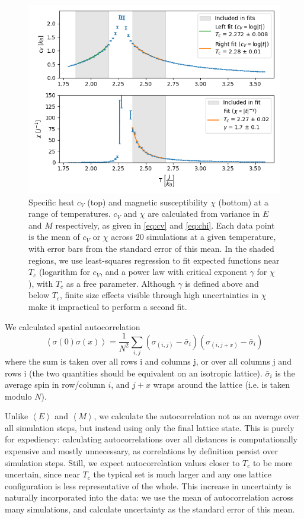 \documentclass[letter,scriptaddress,twocolumn, prl,nofootinbib]{revtex4}
\newcommand{\submin}[1]{\left\langle #1 \right\rangle}
\begin{document}
\begin{figure}[h]
	\begin{center}
		\includegraphics[width=.4\textwidth]{figs/fig3.png}
		\caption{Specific heat $c_V$ (top) and magnetic susceptibility $\chi$ (bottom) at a range of temperatures. $c_V$ and $\chi$ are calculated from variance in $E$ and $M$ respectively, as given in \autoref{eq:cv} and \autoref{eq:chi}. Each data point is the mean of $c_V$ or $\chi$ across 20 simulations at a given temperature, with error bars from the standard error of this mean. In the shaded regions, we use least-squares regression to fit expected functions near $T_c$ (logarithm for $c_V$, and a power law with critical exponent $\gamma$ for $\chi$), with $T_c$ as a free parameter. Although $\gamma$ is defined above and below $T_c$, finite size effects visible through high uncertainties in $\chi$ make it impractical to perform a second fit.}
		\label{fig:fig3}
	\end{center}
\end{figure}

We calculated spatial autocorrelation 
\begin{equation}
	\label{autocor}
	\submin{\sigma(0)\sigma(x)} = \frac{1}{N^2}\sum_{i, j} (\sigma_{(i, j)} - \bar{\sigma}_i)(\sigma_{(i, j + x)} - \bar{\sigma}_i)
\end{equation}
where the sum is taken over all rows i and columns j, or over all columns j and rows i (the two quantities should be equivalent on an isotropic lattice). $\bar{\sigma}_i$ is the average spin in row/column $i$, and $j + x$ wraps around the lattice (i.e. is taken modulo $N$).

Unlike $\submin{E}$ and $\submin{M}$, we calculate the autocorrelation not as an average over all simulation steps, but instead using only the final lattice state. This is purely for expediency: calculating autocorrelations over all distances is computationally expensive and mostly unnecessary, as correlations by definition persist over simulation steps. Still, we expect autocorrelation values closer to $T_c$ to be more uncertain, since near $T_c$ the typical set is much larger and any one lattice configuration is less representative of the whole. This increase in uncertainty is naturally incorporated into the data: we use the mean of autocorrelation across many simulations, and calculate uncertainty as the standard error of this mean.
\end{document}
